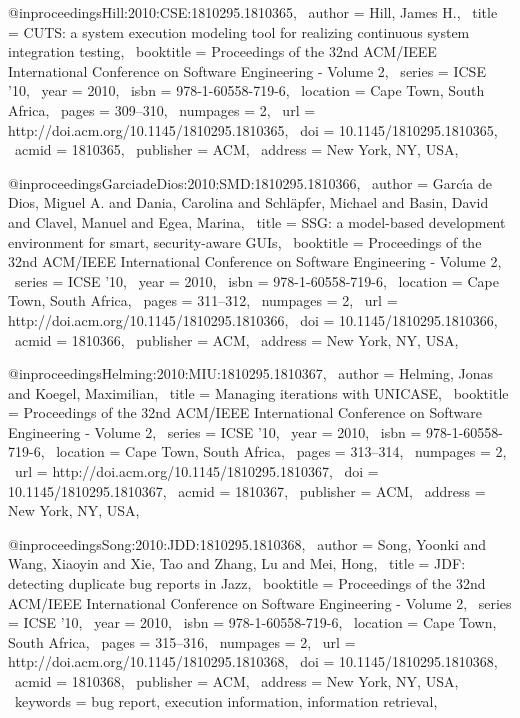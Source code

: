 @inproceedings{Hill:2010:CSE:1810295.1810365,
 author = {Hill, James H.},
 title = {CUTS: a system execution modeling tool for realizing continuous system integration testing},
 booktitle = {Proceedings of the 32nd ACM/IEEE International Conference on Software Engineering - Volume 2},
 series = {ICSE '10},
 year = {2010},
 isbn = {978-1-60558-719-6},
 location = {Cape Town, South Africa},
 pages = {309--310},
 numpages = {2},
 url = {http://doi.acm.org/10.1145/1810295.1810365},
 doi = {10.1145/1810295.1810365},
 acmid = {1810365},
 publisher = {ACM},
 address = {New York, NY, USA},
} 

@inproceedings{GarciadeDios:2010:SMD:1810295.1810366,
 author = {Garc\'{\i}a de Dios, Miguel A. and Dania, Carolina and Schl\"{a}pfer, Michael and Basin, David and Clavel, Manuel and Egea, Marina},
 title = {SSG: a model-based development environment for smart, security-aware GUIs},
 booktitle = {Proceedings of the 32nd ACM/IEEE International Conference on Software Engineering - Volume 2},
 series = {ICSE '10},
 year = {2010},
 isbn = {978-1-60558-719-6},
 location = {Cape Town, South Africa},
 pages = {311--312},
 numpages = {2},
 url = {http://doi.acm.org/10.1145/1810295.1810366},
 doi = {10.1145/1810295.1810366},
 acmid = {1810366},
 publisher = {ACM},
 address = {New York, NY, USA},
} 

@inproceedings{Helming:2010:MIU:1810295.1810367,
 author = {Helming, Jonas and Koegel, Maximilian},
 title = {Managing iterations with UNICASE},
 booktitle = {Proceedings of the 32nd ACM/IEEE International Conference on Software Engineering - Volume 2},
 series = {ICSE '10},
 year = {2010},
 isbn = {978-1-60558-719-6},
 location = {Cape Town, South Africa},
 pages = {313--314},
 numpages = {2},
 url = {http://doi.acm.org/10.1145/1810295.1810367},
 doi = {10.1145/1810295.1810367},
 acmid = {1810367},
 publisher = {ACM},
 address = {New York, NY, USA},
} 

@inproceedings{Song:2010:JDD:1810295.1810368,
 author = {Song, Yoonki and Wang, Xiaoyin and Xie, Tao and Zhang, Lu and Mei, Hong},
 title = {JDF: detecting duplicate bug reports in Jazz},
 booktitle = {Proceedings of the 32nd ACM/IEEE International Conference on Software Engineering - Volume 2},
 series = {ICSE '10},
 year = {2010},
 isbn = {978-1-60558-719-6},
 location = {Cape Town, South Africa},
 pages = {315--316},
 numpages = {2},
 url = {http://doi.acm.org/10.1145/1810295.1810368},
 doi = {10.1145/1810295.1810368},
 acmid = {1810368},
 publisher = {ACM},
 address = {New York, NY, USA},
 keywords = {bug report, execution information, information retrieval},
} 

